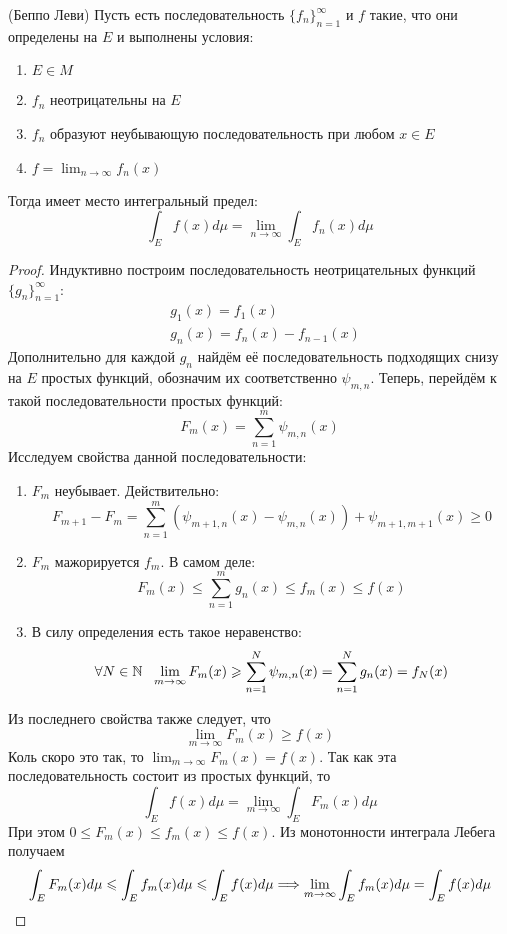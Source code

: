\begin{theorem} (Беппо Леви)
	Пусть есть последовательность $\{f_n\}_{n = 1}^\infty$ и $f$ такие, что они определены на $E$ и выполнены условия:
	\begin{enumerate}
		\item $E \in M$
		
		\item $f_n$ неотрицательны на $E$
		
		\item $f_n$ образуют неубывающую последовательность при любом $x \in E$
		
		\item $f = \lim_{n \to \infty} f_n(x)$
	\end{enumerate}
	Тогда имеет место интегральный предел:
	\[
		\int_E f(x)d\mu = \lim_{n \to \infty} \int_E f_n(x)d\mu
	\]
\end{theorem}

\begin{proof}
	Индуктивно построим последовательность неотрицательных функций $\{g_n\}_{n = 1}^\infty$:
	\begin{align*}
		&{g_1(x) = f_1(x)}
		\\
		&{g_n(x) = f_n(x) - f_{n - 1}(x)}
	\end{align*}
	Дополнительно для каждой $g_n$ найдём её последовательность подходящих снизу на $E$ простых функций, обозначим их соответственно $\psi_{m, n}$. Теперь, перейдём к такой последовательности простых функций:
	\[
		F_m(x) = \sum_{n = 1}^m \psi_{m, n}(x)
	\]
	Исследуем свойства данной последовательности:
	\begin{enumerate}
		\item $F_m$ неубывает. Действительно:
		\[
			F_{m + 1} - F_m = \sum_{n = 1}^m (\psi_{m + 1, n}(x) - \psi_{m, n}(x)) + \psi_{m + 1, m + 1}(x) \ge 0
		\]
		
		\item $F_m$ мажорируется $f_m$. В самом деле:
		\[
			F_m(x) \le \sum_{n = 1}^m g_n(x) \le f_m(x) \le f(x)
		\]
		
		\item В силу определения есть такое неравенство:
		\[
			\forall N \in \mathbb{N}\ \ \lim_{m \to \infty} F_m(x) \geqslant \sum_{n = 1}^N \psi_{m, n}(x) = \sum_{n = 1}^N g_n(x) = f_N(x)
		\]
	\end{enumerate}
	Из последнего свойства также следует, что
	\[
		\lim_{m \to \infty} F_m(x) \ge f(x)
	\]
	Коль скоро это так, то $\lim_{m \to \infty} F_m(x) = f(x)$. Так как эта последовательность состоит из простых функций, то
	\[
		\int_E f(x)d\mu = \lim_{m \to \infty} \int_E F_m(x)d\mu
	\]
	При этом $0 \le F_m(x) \le f_m(x) \le f(x)$. Из монотонности интеграла Лебега получаем
	\[
		\int_E F_m(x)d\mu \leqslant \int_E f_m(x)d\mu \leqslant \int_E f(x)d\mu \Longrightarrow \lim_{m \to \infty} \int_E f_m(x)d\mu = \int_E f(x)d\mu
	\]
\end{proof}

